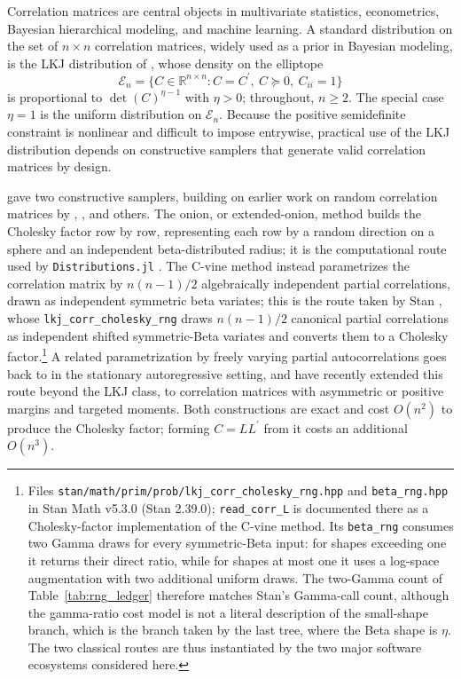 \documentclass[12pt,english]{article}
\theoremstyle{plain} %
\theoremstyle{definition} %
\theoremstyle{remark} %
\begin{document}
Correlation matrices are central objects in multivariate statistics, econometrics, Bayesian hierarchical modeling, and machine learning. A standard distribution on the set of $n\times n$ correlation matrices, widely used as a prior in Bayesian modeling, is the LKJ distribution of
\citet{LewandowskiKurowickaJoe:2009}, whose density on the elliptope
$$
\mathcal{E}_n=\{C\in\mathbb{R}^{n\times n}:C=C^\prime,\ C\succeq0,\ C_{ii}=1\}
$$
is proportional to
$\det(C)^{\eta-1}$ with $\eta>0$; throughout, $n\geq2$.
The special case $\eta=1$ is the uniform distribution on $\mathcal{E}_n$. Because the positive semidefinite constraint is nonlinear and difficult to impose entrywise, practical use of the LKJ distribution depends on constructive samplers that generate valid correlation matrices by design.

\citet{LewandowskiKurowickaJoe:2009} gave two constructive samplers, building on earlier work on random correlation matrices by \citet{Joe:2006}, \citet{MarsagliaOlkin:1984}, and others. The onion, or extended-onion, method builds the Cholesky factor row by row, representing each row by a random direction on a sphere and an independent beta-distributed radius; it is the computational route used by \texttt{Distributions.jl} \citep{Besancon:2021}. The C-vine method instead parametrizes the correlation matrix by $n(n-1)/2$ algebraically independent partial correlations, drawn as independent symmetric beta variates; this is the route taken by Stan \citep{Carpenter:2017,StanFunctions:2026}, whose \texttt{lkj\_corr\_cholesky\_rng} draws $n(n-1)/2$ canonical partial correlations as independent shifted symmetric-Beta variates and converts them to a Cholesky factor.\footnote{Files \texttt{stan/math/prim/prob/lkj\_corr\_cholesky\_rng.hpp} and \texttt{beta\_rng.hpp} in Stan Math v5.3.0 (Stan 2.39.0); \texttt{read\_corr\_L} is documented there as a Cholesky-factor implementation of the C-vine method. Its \texttt{beta\_rng} consumes two Gamma draws for every symmetric-Beta input: for shapes exceeding one it returns their direct ratio, while for shapes at most one it uses a log-space augmentation with two additional uniform draws. The two-Gamma count of Table~\ref{tab:rng_ledger} therefore matches Stan's Gamma-call count, although the gamma-ratio cost model is not a literal description of the small-shape branch, which is the branch taken by the last tree, where the Beta shape is $\eta$. The two classical routes are thus instantiated by the two major software ecosystems considered here.} A related parametrization by freely varying partial autocorrelations goes back to \citet{Barndorff-NielsenSchou:1973} in the stationary autoregressive setting, and \citet{JoeKurowicka:2026} have recently extended this route beyond the LKJ class, to correlation matrices with asymmetric or positive margins and targeted moments. Both constructions are exact and cost $O(n^2)$ to produce the Cholesky factor; forming $C=LL^\prime$ from it costs an additional $O(n^3)$.
\end{document}
